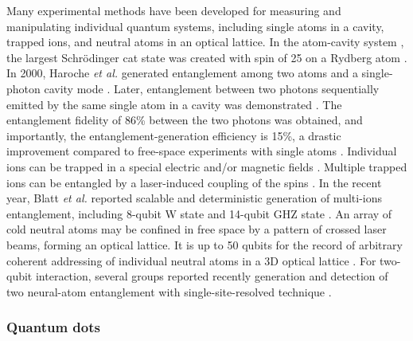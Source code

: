 \documentclass[aps,rmp,twocolumn,amsmath,amssymb,nofootinbib,superscriptaddress,longbibliography,floatfix,table-of-contents,eqsecnum]{revtex4-1}
\begin{document}
Many experimental methods have been developed for measuring and manipulating individual quantum systems, including single atoms in a cavity, trapped ions, and neutral atoms in an optical lattice. In the atom-cavity system \cite{haroche2006exploring}, the largest Schr{\"o}dinger cat state was created with spin of 25 on a Rydberg atom \cite{facon2016sensitive}. In 2000, Haroche \textit{et al.} generated entanglement among two atoms and a single-photon cavity mode \cite{rauschenbeutel2000step}. Later, entanglement between two photons sequentially emitted by the same single atom in a cavity was demonstrated \cite{wilk2007single}. The entanglement fidelity of 86\% between the two photons was obtained, and importantly, the entanglement-generation efficiency is 15\%, a drastic improvement compared to free-space experiments with single atoms \cite{blinov2004observation}. Individual ions can be trapped in a special electric and/or magnetic fields \cite{leibfried2003quantum}. Multiple trapped ions can be entangled by a laser-induced coupling of the spins \cite{blatt2008entangled}. In the recent year, Blatt \textit{et al.} reported scalable and deterministic generation of multi-ions entanglement, including 8-qubit W state \cite{haffner2005scalable} and 14-qubit GHZ state \cite{monz2011}. An array of cold neutral atoms may be confined in free space by a pattern of crossed laser beams, forming an optical lattice. It is up to 50 qubits for the record of arbitrary coherent addressing of individual neutral atoms in a 3D optical lattice \cite{wang2015coherent}. For two-qubit interaction, several groups reported recently generation and detection of two neural-atom entanglement with single-site-resolved technique \cite{kaufman2015entangling, islam2015measuring, dai2016generation}.

%
%

\subsubsection{Quantum dots} 
\end{document}
